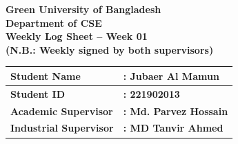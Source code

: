 \documentclass[a4paper,11pt]{article}
\begin{document}
\begin{center}
    {\Large \textbf{Green University of Bangladesh}} \\[0.5em]
    {\large \textbf{Department of CSE}} \\[0.5em]
    {\large \textbf{Weekly Log Sheet -- Week 01}} \\[0.5em]
    {\color{red} \textbf{(N.B.: Weekly signed by both supervisors)}}
\end{center}

\vspace{1em}

\begin{tabularx}{\textwidth}{|l|X|}
\hline
\textbf{Student Name} & \textbf{: Jubaer Al Mamun} \\ \hline
\textbf{Student ID} & \textbf{: 221902013} \\ \hline
\textbf{Academic Supervisor} & \textbf{: Md. Parvez Hossain} \\ \hline
\textbf{Industrial Supervisor} & \textbf{: MD Tanvir Ahmed} \\ \hline
\end{tabularx}

\vspace{1em}
\end{document}
